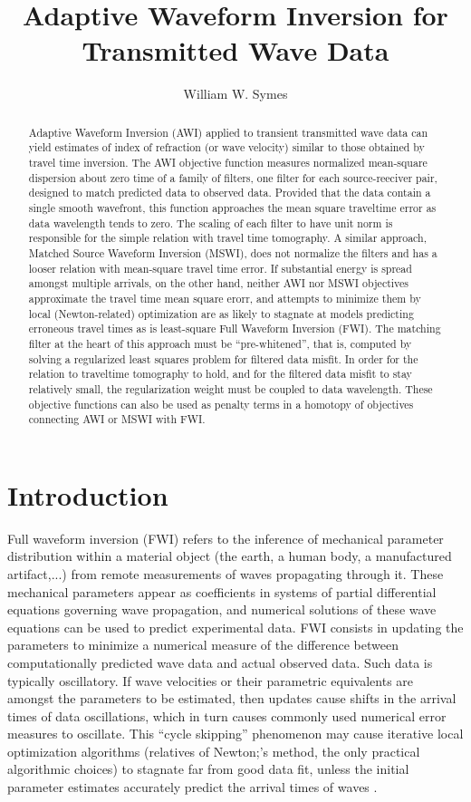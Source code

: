 \title{Adaptive Waveform Inversion for Transmitted Wave Data}
\author{William W. Symes}

\begin{abstract} Adaptive Waveform Inversion (AWI) applied to
  transient transmitted wave data can yield estimates of index of
  refraction (or wave velocity) similar to those obtained by travel
  time inversion. The AWI objective function measures normalized
  mean-square dispersion about zero time of a family of filters, one
  filter for each source-reeciver pair, designed to match predicted
  data to observed data. Provided that the data contain a single
  smooth wavefront, this function approaches the mean square
  traveltime error as data wavelength tends to zero. The scaling of
  each filter to have unit norm is responsible for the simple relation
  with travel time tomography. A similar approach, Matched Source
  Waveform Inversion (MSWI), does not normalize the filters and has a
  looser relation with mean-square travel time error. If substantial
  energy is spread amongst multiple arrivals, on the other hand,
  neither AWI nor MSWI objectives approximate the travel time mean
  square erorr, and attempts to minimize them by local
  (Newton-related) optimization are as likely to stagnate at models
  predicting erroneous travel times as is least-square Full Waveform
  Inversion (FWI). The matching filter at the heart of this approach
  must be ``pre-whitened'', that is, computed by solving a regularized
  least squares problem for filtered data misfit. In order for the
  relation to traveltime tomography to hold, and for the filtered data
  misfit to stay relatively small, the regularization weight must be
  coupled to data wavelength. These objective functions can also be
  used as penalty terms in a homotopy of objectives connecting AWI or
  MSWI with FWI. \end{abstract}

\section{Introduction}
Full waveform inversion (FWI) refers to the inference of mechanical
parameter distribution within a material object  (the earth, a human
body, a manufactured artifact,...) from remote measurements of waves
propagating through it. These mechanical parameters appear as
coefficients in systems of partial differential equations governing
wave propagation, and numerical solutions of these wave equations can
be used to predict experimental data. FWI consists in
updating the parameters to minimize a numerical measure of  the difference between computationally
predicted wave data and actual observed
data. Such data is typically oscillatory. If wave velocities or their parametric equivalents are amongst the parameters
to be estimated, then updates cause shifts in the arrival times of
data oscillations, which in turn causes commonly used numerical error measures
to oscillate. This ``cycle skipping'' phenomenon may cause iterative local optimization algorithms (relatives of
Newton;'s method, the only practical algorithmic choices) to stagnate
far from good data fit, unless the initial
parameter estimates accurately predict the arrival times of waves \cite[]{GauTarVir:86,VirieuxOperto:09,HuetalIEEE:18}.

